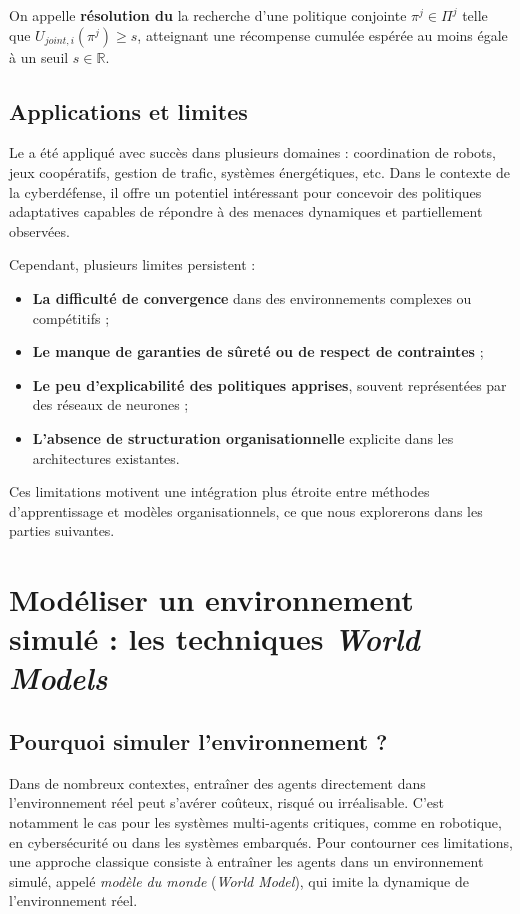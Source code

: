 On appelle \textbf{résolution du } la recherche d'une politique conjointe $\pi^j \in \Pi^j$ telle que $U_{joint,i}(\pi^j) \geq s$, atteignant une récompense cumulée espérée au moins égale à un seuil $s \in \mathbb{R}$.


\subsection{Applications et limites}

Le  a été appliqué avec succès dans plusieurs domaines : coordination de robots, jeux coopératifs, gestion de trafic, systèmes énergétiques, etc. Dans le contexte de la cyberdéfense, il offre un potentiel intéressant pour concevoir des politiques adaptatives capables de répondre à des menaces dynamiques et partiellement observées.

Cependant, plusieurs limites persistent :
\begin{itemize}
    \item \textbf{La difficulté de convergence} dans des environnements complexes ou compétitifs ;
    \item \textbf{Le manque de garanties de sûreté ou de respect de contraintes} ;
    \item \textbf{Le peu d'explicabilité des politiques apprises}, souvent représentées par des réseaux de neurones ;
    \item \textbf{L'absence de structuration organisationnelle} explicite dans les architectures existantes.
\end{itemize}

Ces limitations motivent une intégration plus étroite entre méthodes d'apprentissage et modèles organisationnels, ce que nous explorerons dans les parties suivantes.


\section{Modéliser un environnement simulé : les techniques \textit{World Models}}


\subsection{Pourquoi simuler l'environnement ?}

Dans de nombreux contextes, entraîner des agents directement dans l'environnement réel peut s'avérer coûteux, risqué ou irréalisable. C'est notamment le cas pour les systèmes multi-agents critiques, comme en robotique, en cybersécurité ou dans les systèmes embarqués. Pour contourner ces limitations, une approche classique consiste à entraîner les agents dans un environnement simulé, appelé \textit{modèle du monde} (\textit{World Model}), qui imite la dynamique de l'environnement réel.

